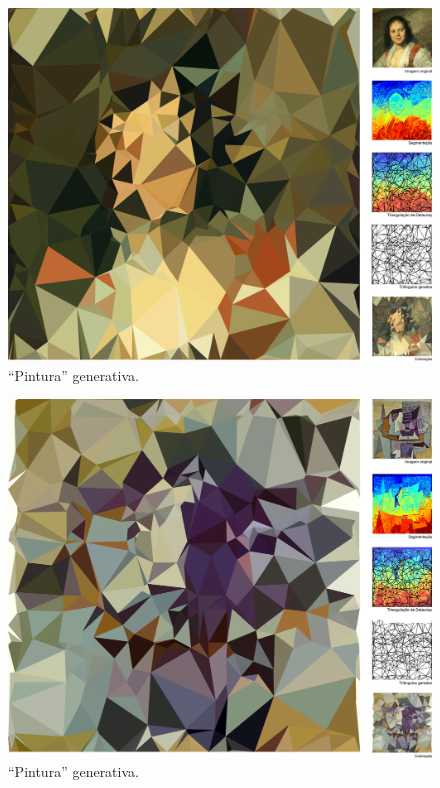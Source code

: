 \begin{figure}[htb]
  \begin{center}
    \includegraphics[width=\textwidth]{figs/posterA}
    \caption{``Pintura'' generativa.}
  \label{fig:posterA}
  \end{center}
\end{figure}

\begin{figure}[htb]
  \begin{center}
    \includegraphics[width=\textwidth]{figs/posterB}
    \caption{``Pintura'' generativa.}
  \label{fig:posterB}
  \end{center}
\end{figure}


